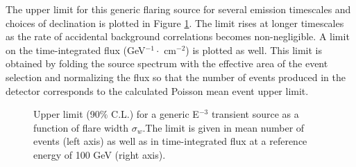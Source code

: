 \documentclass[manuscript]{aastex}
\begin{document}
The upper limit for this generic flaring source for several emission timescales and choices of declination is plotted in Figure \ref{fig:GenericE3Limit}. The limit rises at longer timescales as the rate of accidental background correlations becomes non-negligible. A limit on the time-integrated flux (GeV$^{-1} \cdot$ cm$^{-2}$) is plotted as well. This limit is obtained by folding the source spectrum with the effective area of the event selection and normalizing the flux so that the number of events produced in the detector corresponds to the calculated Poisson mean event upper limit. 

\begin{figure}[ht]
\caption[Time-integrated Flux Limit for E$^{-3}$ Source]{Upper limit (90$\%$ C.L.) for a generic E$^{-3}$ transient source as a function of flare width $\sigma_w$.The limit is given in mean number of events (left axis) as well as in time-integrated flux at a reference energy of 100 GeV (right axis).}
\label{fig:GenericE3Limit}
\end{figure}
\end{document}
